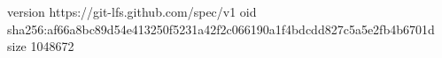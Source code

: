 version https://git-lfs.github.com/spec/v1
oid sha256:af66a8bc89d54e413250f5231a42f2c066190a1f4bdcdd827c5a5e2fb4b6701d
size 1048672
